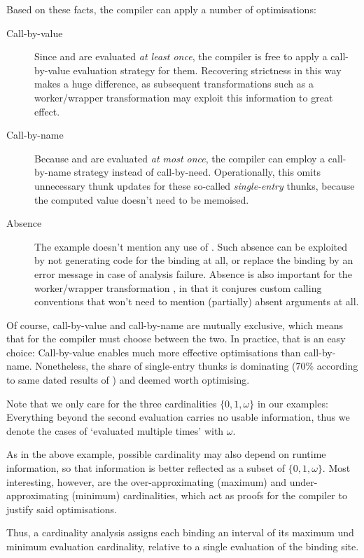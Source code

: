 Based on these facts, the compiler can apply a number of optimisations:
\begin{description}
  \item[Call-by-value] 
    Since  and  are evaluated \emph{at least once}, the compiler is free to apply a call-by-value evaluation strategy for them.
    Recovering strictness in this way makes a huge difference, as subsequent transformations such as a worker/wrapper transformation \parencite{ww} may exploit this information to great effect.
  \item[Call-by-name]
    Because  and  are evaluated \emph{at most once}, the compiler can employ a call-by-name strategy instead of call-by-need.
    Operationally, this omits unnecessary thunk updates for these so-called \emph{single-entry} thunks, because the computed value doesn't need to be memoised.
  \item[Absence]
    The example doesn't mention any use of . 
    Such absence can be exploited by not generating code for the binding at all, or replace the binding by an error message in case of analysis failure.
    Absence is also important for the worker/wrapper transformation \parencite{ww}, in that it conjures custom calling conventions that won't need to mention (partially) absent arguments at all.
\end{description}

Of course, call-by-value and call-by-name are mutually exclusive, which means that for  the compiler must choose between the two. 
In practice, that is an easy choice: 
Call-by-value enables much more effective optimisations than call-by-name.
Nonetheless, the share of single-entry thunks is dominating (70\% according to same dated results of \textcite{updabs}) and deemed worth optimising.

Note that we only care for the three cardinalities $\{0, 1, \omega\}$ in our examples:
Everything beyond the second evaluation carries no usable information, thus we denote the cases of `evaluated multiple times' with $\omega$.

As in the above example, possible cardinality may also depend on runtime information, so that information is better reflected as a subset of $\{0, 1, \omega\}$.
Most interesting, however, are the over-approximating (\eg maximum) and under-approximating (\eg minimum) cardinalities, which act as proofs for the compiler to justify said optimisations.

Thus, a cardinality analysis assigns each binding an interval of its maximum und minimum evaluation cardinality, relative to a single evaluation of the binding site.


